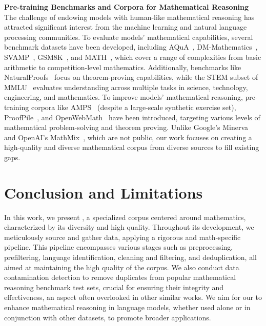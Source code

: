 \noindent\textbf{Pre-training Benchmarks and Corpora for Mathematical Reasoning} \quad The challenge of endowing models with human-like mathematical reasoning has attracted significant interest from the machine learning and natural language processing communities. To evaluate models' mathematical capabilities, several benchmark datasets have been developed, including AQuA~\citep{ling-etal-2017-program}, DM-Mathematics~\citep{DBLP:conf/iclr/SaxtonGHK19-deepmind-mathematics}, SVAMP~\citep{patel-etal-2021-nlp},  GSM8K~\citep{DBLP:journals/corr/abs-2110-14168-GSM8K}, and MATH~\citep{DBLP:conf/nips/HendrycksBKABTS21-math}, which cover a range of complexities from basic arithmetic to competition-level mathematics. Additionally, benchmarks like NaturalProofs~\citep{DBLP:conf/nips/Welleck0BHCCC21-naturalproofs} focus on theorem-proving capabilities, while the STEM subset of MMLU~\citep{DBLP:conf/iclr/HendrycksBBZMSS21-MMLU} evaluates understanding across multiple tasks in science, technology, engineering, and mathematics. To improve models' mathematical reasoning, pre-training corpora like AMPS~\citep{DBLP:conf/nips/HendrycksBKABTS21-math} (despite a large-scale synthetic exercise set), ProofPile~\citep{DBLP:journals/corr/abs-2302-12433-proofpile}, and OpenWebMath~\citep{DBLP:journals/corr/abs-2310-06786-openwebmath} have been introduced, targeting various levels of mathematical problem-solving and theorem proving. Unlike Google's Minerva~\citep{DBLP:conf/nips/LewkowyczADDMRS22-minerva} and OpenAI's MathMix~\citep{DBLP:journals/corr/abs-2305-20050-lets-verify-step-by-step}, which are not public, our work focuses on creating a high-quality and diverse mathematical corpus from diverse sources to fill existing gaps.

\section{Conclusion and Limitations}

In this work, we present \mathpile, a specialized corpus centered around mathematics, characterized by its diversity and high quality. Throughout its development, we meticulously source and gather data, applying a rigorous and math-specific pipeline. This pipeline encompasses various stages such as preprocessing, prefiltering, language identification, cleaning and filtering, and deduplication, all aimed at maintaining the high quality of the corpus. We also conduct data contamination detection to remove duplicates from popular mathematical reasoning benchmark test sets, crucial for ensuring their integrity and effectiveness, an aspect often overlooked in other similar works. We aim for our \mathpile to enhance mathematical reasoning in language models, whether used alone or in conjunction with other datasets, to promote broader applications.

